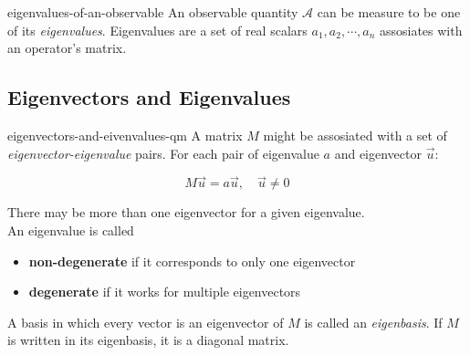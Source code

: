 \documentclass[preview]{standalone}
\begin{document}
\begin{snippet}{eigenvalues-of-an-observable}
    An observable quantity \(\mathcal{A}\) can be measure to be one of its \textit{eigenvalues}.
    Eigenvalues are a set of real scalars \(a_1, a_2, \cdots , a_n\) assosiates with
    an operator's matrix.
\end{snippet}

\subsection{Eigenvectors and Eigenvalues}

\begin{snippet}{eigenvectors-and-eivenvalues-qm}
    A matrix \(M\) might be assosiated with a set of \textit{eigenvector-eigenvalue} pairs.
    For each pair of eigenvalue \(a\) and eigenvector \(\vec{u}\):

    \[
        M\vec{u}=a\vec{u},
        \quad\vec{u}\neq 0
    \]

    There may be more than one eigenvector for a given eigenvalue. \\
    An eigenvalue is called
    \begin{itemize}
        \item \textbf{non-degenerate} if it corresponds to only one eigenvector
        \item \textbf{degenerate} if it works for multiple eigenvectors
    \end{itemize}

    A basis in which every vector is an eigenvector of \(M\) is called an \textit{eigenbasis}.
    If \(M\) is written in its eigenbasis, it is a diagonal matrix.
\end{snippet}

\end{document}
